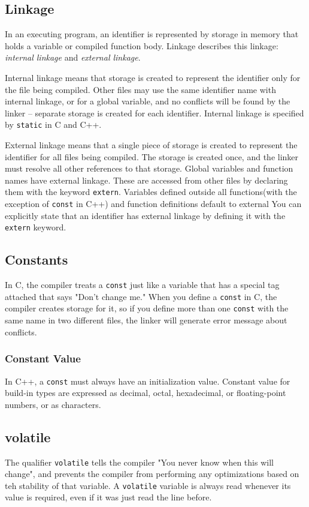 \documentclass[11pt, a4paper]{book}
\begin{document}
\subsection{Linkage}
In an executing program, an identifier is represented by storage in memory that
holds a variable or compiled function body. Linkage describes this linkage:
\emph{internal linkage} and \emph{external linkage}.

Internal linkage means that storage is created to represent the identifier only
for the file being compiled. Other files may use the same identifier name with
internal linkage, or for a global variable, and no conflicts will be found by
the linker -- separate storage is created for each identifier. Internal linkage
is specified by \verb|static| in C and C++.


External linkage means that a single piece of storage is created to represent
the identifier for all files being compiled. The storage is created once, and
the linker must resolve all other references to that storage. Global variables
and function names have external linkage. These are accessed from other files by
declaring them with the keyword \verb|extern|. Variables defined outside all
functions(with the exception of \verb|const| in C++) and function definitions
default to external  You can explicitly state that an identifier has external
linkage by defining it with the \verb|extern| keyword.

\subsection{Constants}
In C, the compiler treats a \verb|const| just like a variable that has a special
tag attached that says "Don't change me." When you define a \verb|const| in C,
the compiler creates storage for it, so if you define more than one \verb|const|
with the same name in two different files, the linker will generate error
message about conflicts.

\subsubsection{Constant Value}
In C++, a \verb|const| must always have an initialization value. Constant value
for build-in types are expressed as decimal, octal, hexadecimal, or
floating-point numbers, or as characters.

\subsection{volatile}
The qualifier \verb|volatile| tells the compiler "You never know when this will
change", and prevents the compiler from performing any optimizations based on
teh stability of that variable. A \verb|volatile| variable is always read
whenever its value is required, even if it was just read the line before.
\end{document}
